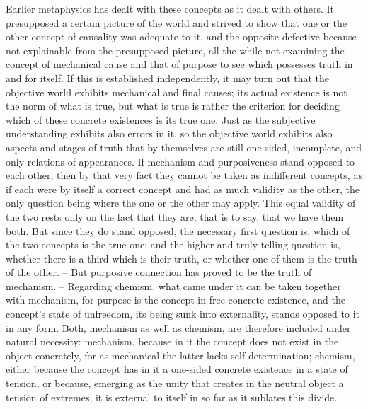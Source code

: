 Earlier metaphysics has dealt with these concepts as it dealt with others.
It presupposed a certain picture of the world and strived to show that
one or the other concept of causality was adequate to it, and the opposite
defective because not explainable from the presupposed picture, all the while
not examining the concept of mechanical cause and that of purpose to see
which possesses truth in and for itself. If this is established independently, it
may turn out that the objective world exhibits mechanical and final causes;
its actual existence is not the norm of what is true, but what is true is rather
the criterion for deciding which of these concrete existences is its true one.
Just as the subjective understanding exhibits also errors in it, so the objective
world exhibits also aspects and stages of truth that by themselves are still
one-sided, incomplete, and only relations of appearances. If mechanism
and purposiveness stand opposed to each other, then by that very fact they
cannot be taken as indifferent concepts, as if each were by itself a correct
concept and had as much validity as the other, the only question being
where the one or the other may apply. This equal validity of the two rests
only on the fact that they are, that is to say, that we have them both. But
since they do stand opposed, the necessary first question is, which of the
two concepts is the true one; and the higher and truly telling question is,
whether there is a third which is their truth, or whether one of them is the
truth of the other. – But purposive connection has proved to be the truth of
mechanism. – Regarding chemism, what came under it can be taken together
with mechanism, for purpose is the concept in free concrete existence, and
the concept's state of unfreedom, its being sunk into externality, stands
opposed to it in any form. Both, mechanism as well as chemism, are
therefore included under natural necessity: mechanism, because in it the
concept does not exist in the object concretely, for as mechanical the latter
lacks self-determination; chemism, either because the concept has in it a
one-sided concrete existence in a state of tension, or because, emerging
as the unity that creates in the neutral object a tension of extremes, it is
external to itself in so far as it sublates this divide.


